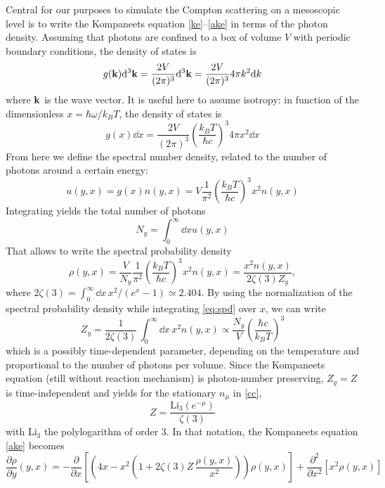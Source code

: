 \documentclass[a4paper,12pt,reqno,superscriptaddress,nofootinbib]{revtex4}
\theoremstyle{plain}
\theoremstyle{definition}
\theoremstyle{remark}
\newcommand{\0}{^{(0)}}
\newcommand{\1}{^{(1)}}
\newcommand{\2}{^{(2)}}
\begin{document}
Central for our purposes to simulate the Compton scattering on a mesoscopic level is to write the Kompaneets equation \eqref{ke}--\eqref{ake} in terms of the photon density. 
Assuming that photons are confined to a box of volume $V$ with periodic boundary conditions, the density of states is
\[
g(\vb{k}) \dd^3 \vb{k} = \frac{2V}{(2\pi)^3} \dd^3 \vb{k} = \frac{2V}{(2\pi)^3} 
4\pi k^2 \dd k
\]
where $\vb{k}$ is the wave vector.  It is useful here to 
assume isotropy: in function of the dimensionless $x = \hbar \omega / k_B T$, the density of states is
\[
g(x) \dd x = \frac{2V}{(2\pi)^3} \left( \frac{k_B T}{\hbar c} \right)^3 4\pi 
x^2 \dd x
\] 
From here we define the spectral number density, related to the number of photons around a certain energy: 
\begin{equation}\label{eq:snd}
u(y,x) = g(x) n(y,x) = V \frac{1}{\pi^2} \left( \frac{k_B T}{\hbar c} \right)^3 
x^2 n(y,x)
\end{equation}
Integrating yields the total number of photons
\[ N_y = \int_0^\infty \dd{x} u(y,x)
 \]
That allows to write the spectral probability density
\begin{equation}\label{eq:spd}
\rho(y,x) = \frac{V}{N_y} \frac{1}{\pi^2} \left(\frac{k_B T}{\hbar c}\right)^3 
x^2 n(y,x) = \frac{x^2 n(y,x)}{2\zeta(3) Z_y},
\end{equation}
where $2\zeta(3) = \int_0^\infty \dd x \, x^2/(e^x-1) \simeq 2.404$.
By using the normalization of the spectral probability density while integrating \eqref{eq:spd} over $x$, we can write
\begin{equation}\label{zy}
Z_y =  \frac 1{2\zeta(3)}\,\int_0^\infty \dd x\, x^2 n(y,x) \propto  \frac{N_y}{V} \left(\frac{\hbar c}{k_B T}\right)^3
\end{equation}
which is a possibly time-dependent parameter, depending on the temperature and 
proportional to the number of photons per volume. Since the Kompaneets equation (still without reaction mechanism)
is photon-number preserving, $Z_y=Z$ is time-independent and yields for the 
stationary $n_\mu$ in \eqref{cc},
\[
Z = \frac{\text{Li}_3 (e^{-\mu})}{\zeta(3)}
\]
with Li$_3$ the polylogarithm of order 3.
In that notation, the Kompaneets equation \eqref{ake} becomes
\begin{equation}\label{kp}
\frac{\partial \rho}{\partial y} (y,x) = -\frac{\partial}{\partial x}\left[\left(4x- x^2\left(1+2\zeta(3) Z\,\frac{\rho(y,x)}{x^2}\right)\right)\rho(y,x)\right] + \frac{\partial^2}{\partial x^2}\left[x^2 \rho(y,x)\right]
\end{equation}
\end{document}

